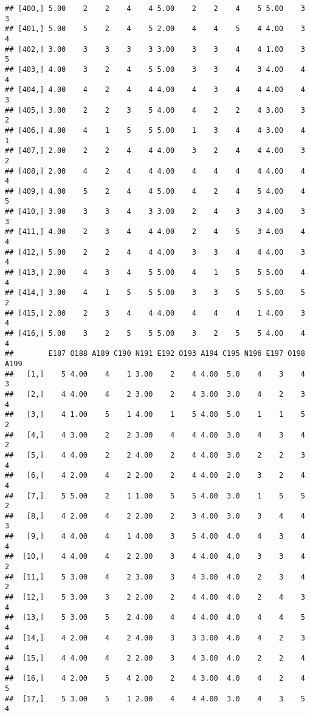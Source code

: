 \documentclass[]{article}
\begin{document}
\begin{verbatim}
## [400,] 5.00    2    2    4    4 5.00    2    2    4    5 5.00    3    3
## [401,] 5.00    5    2    4    5 2.00    4    4    5    4 4.00    3    4
## [402,] 3.00    3    3    3    3 3.00    3    3    4    4 1.00    3    5
## [403,] 4.00    3    2    4    5 5.00    3    3    4    3 4.00    4    4
## [404,] 4.00    4    2    4    4 4.00    4    3    4    4 4.00    4    3
## [405,] 3.00    2    2    3    5 4.00    4    2    2    4 3.00    3    2
## [406,] 4.00    4    1    5    5 5.00    1    3    4    4 3.00    4    1
## [407,] 2.00    2    2    4    4 4.00    3    2    4    4 4.00    3    2
## [408,] 2.00    4    2    4    4 4.00    4    4    4    4 4.00    4    4
## [409,] 4.00    5    2    4    4 5.00    4    2    4    5 4.00    4    5
## [410,] 3.00    3    3    4    3 3.00    2    4    3    3 4.00    3    3
## [411,] 4.00    2    3    4    4 4.00    2    4    5    3 4.00    4    4
## [412,] 5.00    2    2    4    4 4.00    3    3    4    4 4.00    3    4
## [413,] 2.00    4    3    4    5 5.00    4    1    5    5 5.00    4    4
## [414,] 3.00    4    1    5    5 5.00    3    3    5    5 5.00    5    2
## [415,] 2.00    2    3    4    4 4.00    4    4    4    1 4.00    3    4
## [416,] 5.00    3    2    5    5 5.00    3    2    5    5 4.00    4    4
##        E187 O188 A189 C190 N191 E192 O193 A194 C195 N196 E197 O198 A199
##   [1,]    5 4.00    4    1 3.00    2    4 4.00  5.0    4    3    4    3
##   [2,]    4 4.00    4    2 3.00    2    4 3.00  3.0    4    2    3    4
##   [3,]    4 1.00    5    1 4.00    1    5 4.00  5.0    1    1    5    2
##   [4,]    4 3.00    2    2 3.00    4    4 4.00  3.0    4    3    4    2
##   [5,]    4 4.00    2    2 4.00    2    4 4.00  3.0    2    2    3    4
##   [6,]    4 2.00    4    2 2.00    2    4 4.00  2.0    3    2    4    4
##   [7,]    5 5.00    2    1 1.00    5    5 4.00  3.0    1    5    5    2
##   [8,]    4 2.00    4    2 2.00    2    3 4.00  3.0    3    4    4    3
##   [9,]    4 4.00    4    1 4.00    3    5 4.00  4.0    4    3    4    4
##  [10,]    4 4.00    4    2 2.00    3    4 4.00  4.0    3    3    4    2
##  [11,]    5 3.00    4    2 3.00    3    4 3.00  4.0    2    3    4    2
##  [12,]    5 3.00    3    2 2.00    2    4 4.00  4.0    2    4    3    4
##  [13,]    5 3.00    5    2 4.00    4    4 4.00  4.0    4    4    5    4
##  [14,]    4 2.00    4    2 4.00    3    3 3.00  4.0    4    2    3    4
##  [15,]    4 4.00    4    2 2.00    3    4 3.00  4.0    2    2    4    4
##  [16,]    4 2.00    5    4 2.00    2    4 3.00  4.0    4    2    4    5
##  [17,]    5 3.00    5    1 2.00    4    4 4.00  3.0    4    3    5    4

\end{verbatim}
\end{document}
